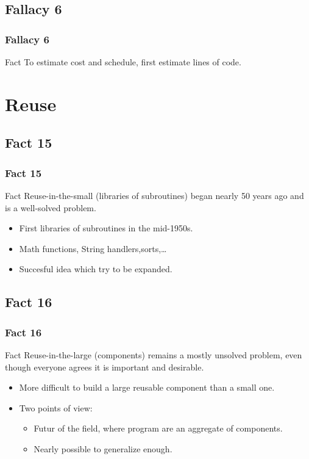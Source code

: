 \documentclass{beamer}
\begin{document}
\subsection{Fallacy 6}
\begin{frame}
    \frametitle{Fallacy 6}
    \begin{block}{Fact}
    To estimate cost and schedule, first estimate lines of code.
    \end{block}
\end{frame}

\section{Reuse}

\subsection{Fact 15}
\begin{frame}
    \frametitle{Fact 15}
    \begin{block}{Fact}
    Reuse-in-the-small (libraries of subroutines) began nearly 50 years ago and
    is a well-solved problem.
    \end{block}
    \begin{itemize}
    		\item First libraries of subroutines in the mid-1950s.
    		\item Math functions, String handlers,sorts,\ldots
    		\item Succesful idea which try to be expanded.
    \end{itemize}
\end{frame}

\subsection{Fact 16}
\begin{frame}
    \frametitle{Fact 16}
    \begin{block}{Fact}
    Reuse-in-the-large (components) remains a mostly unsolved problem, even
    though everyone agrees it is important and desirable.
    \end{block}
    \begin{itemize}
    		\item More difficult to build a large reusable component than a small one.
    		\item Two points of view:
    		\begin{itemize}
    			\item Futur of the field, where program are an aggregate of components.
    			\item Nearly possible to generalize enough.
    		\end{itemize}
    \end{itemize}
\end{frame}
\end{document}
